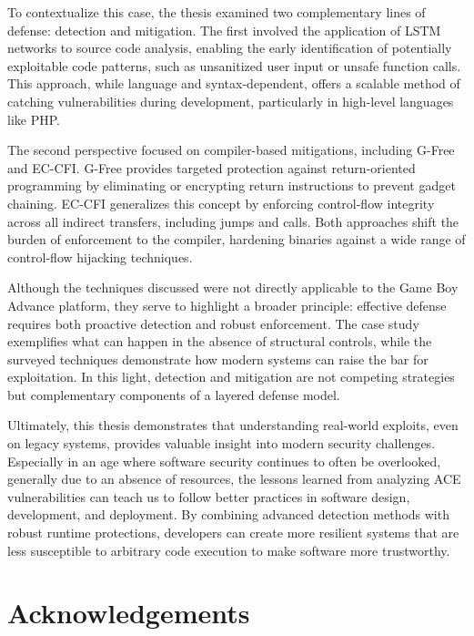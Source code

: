 \documentclass[a4paper]{usiinfbachelorproject}
\begin{document}
To contextualize this case, the thesis examined two complementary lines of defense: detection and mitigation. The first involved the application of LSTM networks to source code analysis, enabling the early identification of potentially exploitable code patterns, such as unsanitized user input or unsafe function calls. This approach, while language and syntax-dependent, offers a scalable method of catching vulnerabilities during development, particularly in high-level languages like PHP.

The second perspective focused on compiler-based mitigations, including G-Free and EC-CFI. G-Free provides targeted protection against return-oriented programming by eliminating or encrypting return instructions to prevent gadget chaining. EC-CFI generalizes this concept by enforcing control-flow integrity across all indirect transfers, including jumps and calls. Both approaches shift the burden of enforcement to the compiler, hardening binaries against a wide range of control-flow hijacking techniques.

Although the techniques discussed were not directly applicable to the Game Boy Advance platform, they serve to highlight a broader principle: effective defense requires both proactive detection and robust enforcement. The case study exemplifies what can happen in the absence of structural controls, while the surveyed techniques demonstrate how modern systems can raise the bar for exploitation. In this light, detection and mitigation are not competing strategies but complementary components of a layered defense model.

Ultimately, this thesis demonstrates that understanding real-world exploits, even on legacy systems, provides valuable insight into modern security challenges. Especially in an age where software security continues to often be overlooked, generally due to an absence of resources, the lessons learned from analyzing ACE vulnerabilities can teach us to follow better practices in software design, development, and deployment. By combining advanced detection methods with robust runtime protections, developers can create more resilient systems that are less susceptible to arbitrary code execution to make software more trustworthy.


\section{Acknowledgements}



\newpage
\end{document}
